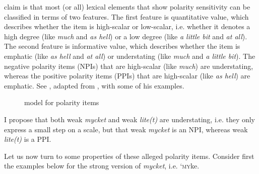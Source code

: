 \documentclass[output=paper]{langscibook}
\begin{document}
 claim is that most (or all) lexical elements that show polarity sensitivity can be classified in terms of two features. The first feature is quantitative value, which describes whether the item is high-scalar or low-scalar, i.e. whether it denotes a high degree (like \textit{much} and \textit{as hell}) or a low degree (like \textit{a little bit} and \textit{at all}). The second feature is informative value, which describes whether the item is emphatic (like \textit{as hell} and \textit{at all}) or understating (like \textit{much} and \textit{a little bit}). The negative polarity items (NPIs) that are high-scalar (like \textit{much}) are understating, whereas the positive polarity items (PPIs) that are high-scalar (like \textit{as hell}) are emphatic. See , adapted from \citet[628]{Israel1996}, with some of his examples.



\begin{figure}
\caption{ model for polarity items\label{fig:delsing:1}}
\end{figure}


I propose that both weak \textit{mycket} and weak \textit{lite(t)} are understating, i.e. they only express a small step on a scale, but that weak \textit{mycket} is an NPI, whereas weak \textit{lite(t)} is a PPI.



Let us now turn to some properties of these alleged polarity items. Consider first the examples below for the strong version of \textit{mycket}, i.e. ‘\textsc{my}ke.
\end{document}
